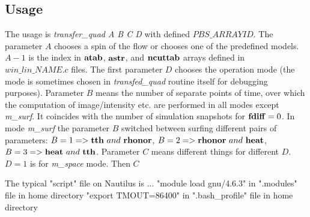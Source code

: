 \documentclass{emulateapj}
\begin{document}
\subsection{Usage}
The usage is \textit{transfer\_quad A B C D} with defined $PBS\_ARRAYID$.
The parameter $A$ chooses a spin of the flow or chooses one of the predefined models. $A-1$ is the index in ${\bf atab}$, ${\bf astr}$, and ${\bf ncuttab}$ arrays defined in
$\textit{win\_lin\_NAME.c}$ files. The first parameter $D$ chooses the operation mode (the mode is sometimes chosen in \textit{transfed\_quad} routine itself for debugging purposes).
Parameter $B$ means the number of separate points of time, over which the computation of image/intensity etc. are performed in all modes except \textit{m\_surf}.
It coincides with the number of simulation snapshots for ${\bf fdiff}=0$. In mode \textit{m\_surf} the parameter $B$ switched between surfing different pairs of parameters:
$B=1 => {\bf tth}~and~{\bf rhonor}$, $B=2 => {\bf rhonor}~and~{\bf heat}$, $B=3 => {\bf heat}~and~{\bf tth}$.
Parameter $C$ means different things for different $D$.
$D=1$ is for {\textit{m\_space}} mode. Then $C$

The typical "script" file on Nautilus is ...
"module load gnu/4.6.3" in ".modules" file in home directory
"export TMOUT=86400" in ".bash\_profile" file in home directory
\end{document}

